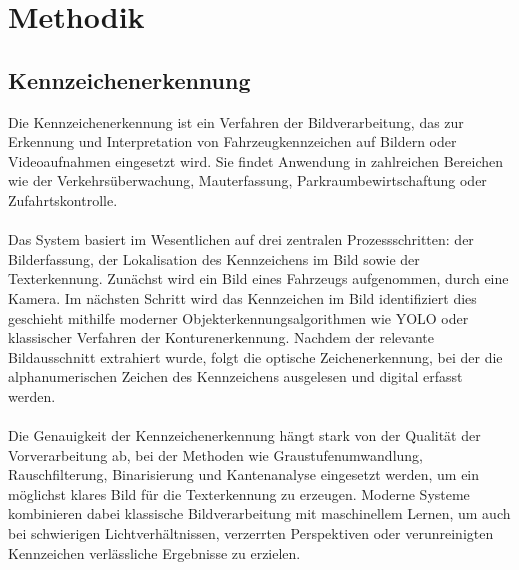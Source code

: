 \section{Methodik}
\subsection{Kennzeichenerkennung}
Die Kennzeichenerkennung ist ein Verfahren der Bildverarbeitung, das zur Erkennung und Interpretation von Fahrzeugkennzeichen auf Bildern oder Videoaufnahmen eingesetzt wird. Sie findet Anwendung in zahlreichen Bereichen wie der Verkehrsüberwachung, Mauterfassung, Parkraumbewirtschaftung oder Zufahrtskontrolle.\\\\
Das System basiert im Wesentlichen auf drei zentralen Prozessschritten: der Bilderfassung, der Lokalisation des Kennzeichens im Bild sowie der Texterkennung. Zunächst wird ein Bild eines Fahrzeugs aufgenommen, durch eine Kamera. Im nächsten Schritt wird das Kennzeichen im Bild identifiziert dies geschieht mithilfe moderner Objekterkennungsalgorithmen wie YOLO oder klassischer Verfahren der Konturenerkennung. Nachdem der relevante Bildausschnitt extrahiert wurde, folgt die optische Zeichenerkennung, bei der die alphanumerischen Zeichen des Kennzeichens ausgelesen und digital erfasst werden.\\\\
Die Genauigkeit der Kennzeichenerkennung hängt stark von der Qualität der Vorverarbeitung ab, bei der Methoden wie Graustufenumwandlung, Rauschfilterung, Binarisierung und Kantenanalyse eingesetzt werden, um ein möglichst klares Bild für die Texterkennung zu erzeugen. Moderne Systeme kombinieren dabei klassische Bildverarbeitung mit maschinellem Lernen, um auch bei schwierigen Lichtverhältnissen, verzerrten Perspektiven oder verunreinigten Kennzeichen verlässliche Ergebnisse zu erzielen.

